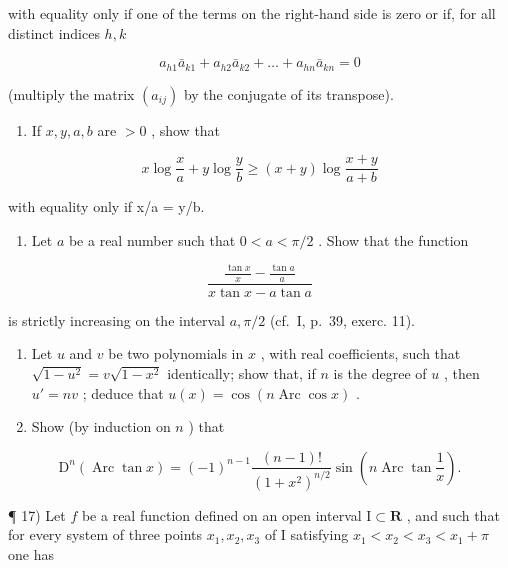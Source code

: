 with equality only if one of the terms on the right-hand side is zero or if, for all distinct indices \(h, k\)

\[
a _ {h 1} \bar {a} _ {k 1} + a _ {h 2} \bar {a} _ {k 2} + \dots + a _ {h n} \bar {a} _ {k n} = 0
\]

(multiply the matrix \((a_{ij})\) by the conjugate of its transpose).

\begin{enumerate}
\def\labelenumi{\arabic{enumi})}
\setcounter{enumi}{12}
\tightlist
\item
  If \(x, y, a, b\) are \(> 0\) , show that
\end{enumerate}

\[
x \log \frac {x}{a} + y \log \frac {y}{b} \geqslant (x + y) \log \frac {x + y}{a + b}
\]

with equality only if x/a = y/b.

\begin{enumerate}
\def\labelenumi{\arabic{enumi})}
\setcounter{enumi}{13}
\tightlist
\item
  Let \(a\) be a real number such that \(0 < a < \pi / 2\) . Show that the function
\end{enumerate}

\[
\frac {\frac {\tan x}{x} - \frac {\tan a}{a}}{x \tan x - a \tan a}
\]

is strictly increasing on the interval \(a, \pi/2\) (cf.~I, p.~39, exerc. 11).

\begin{enumerate}
\def\labelenumi{\arabic{enumi})}
\setcounter{enumi}{14}
\item
  Let \(u\) and \(v\) be two polynomials in \(x\) , with real coefficients, such that \(\sqrt{1 - u^2} = v\sqrt{1 - x^2}\) identically; show that, if \(n\) is the degree of \(u\) , then \(u' = nv\) ; deduce that \(u(x) = \cos(n\operatorname{Arc}\cos x)\) .
\item
  Show (by induction on \(n\) ) that
\end{enumerate}

\[
\mathrm{D} ^ {n} \left(\operatorname{Arc} \tan x\right) = (- 1) ^ {n - 1} \frac {(n - 1) !}{(1 + x ^ {2}) ^ {n / 2}} \sin \left(n \operatorname{Arc} \tan \frac {1}{x}\right).
\]

¶ 17) Let \(f\) be a real function defined on an open interval \(\mathrm{I}\subset \mathbf{R}\) , and such that for every system of three points \(x_{1}, x_{2}, x_{3}\) of I satisfying \(x_{1} < x_{2} < x_{3} < x_{1} + \pi\) one has

